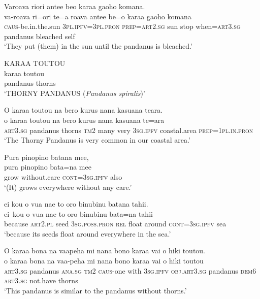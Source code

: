 \ea\label{ex:text9-6}
Varoava riori antee beo karaa gaoho komana.\\
\gll va-roava	ri=ori	te=a	roava	antee	be=o	karaa	gaoho	komana\\
     \textsc{caus}-be.in.the.sun	3\textsc{pl}.\textsc{ipfv}=3\textsc{pl}.\textsc{pron}	\textsc{prep}=\textsc{art}2.\textsc{sg}	sun	stop	when=\textsc{art}3.\textsc{sg}	pandanus	bleached	self\\
\glt `They put (them) in the sun until the pandanus is bleached.'
\z

\ea\label{ex:text9-7}
KARAA TOUTOU\\
\gll karaa	toutou\\
     pandanus	thorns\\
\glt `THORNY PANDANUS (\textit{Pandanus spiralis})'
\z

\ea\label{ex:text9-8}
O karaa toutou na bero kurus nana kasuana teara.\\
\gll o	karaa	toutou	na	bero	kurus	nana	kasuana	te=ara\\
     \textsc{art}3.\textsc{sg}	pandanus	thorns	\textsc{tm}2	many	very	3\textsc{sg}.\textsc{ipfv}	coastal.area	\textsc{prep}=1\textsc{pl}.\textsc{in}.\textsc{pron}\\
\glt `The Thorny Pandanus is very common in our coastal area.'
\z

\ea\label{ex:text9-9}
Pura pinopino batana mee,\\
\gll pura	pinopino	bata=na	mee\\
     grow	without.care	\textsc{cont}=3\textsc{sg}.\textsc{ipfv}	also\\
\glt `(It) grows everywhere without any care.'
\z

\ea\label{ex:text9-10}
ei kou o vua nae to oro binubinu batana tahii.\\
\gll ei~kou	o	vua	nae	to	oro	binubinu	bata=na	tahii\\
     because	\textsc{art}2.\textsc{pl}	seed	3\textsc{sg}.\textsc{poss}.\textsc{pron}	\textsc{rel}	float	around	\textsc{cont}=3\textsc{sg}.\textsc{ipfv}	sea\\
\glt `because its seeds float around everywhere in the sea.'
\z

\ea\label{ex:text9-11}
O karaa bona na vaapeha mi nana bono karaa vai o hiki toutou.\\
\gll o	karaa	bona	na	vaa-peha	mi	nana	bono	karaa	vai	o	hiki	toutou\\
     \textsc{art}3.\textsc{sg}	pandanus	\textsc{ana}.\textsc{sg}	\textsc{tm}2	\textsc{caus}-one	with	3\textsc{sg}.\textsc{ipfv}	\textsc{obj}.\textsc{art}3.\textsc{sg}	pandanus	\textsc{dem}6	\textsc{art}3.\textsc{sg}	not.have	thorns\\
\glt `This pandanus is similar to the pandanus without thorns.'
\z

